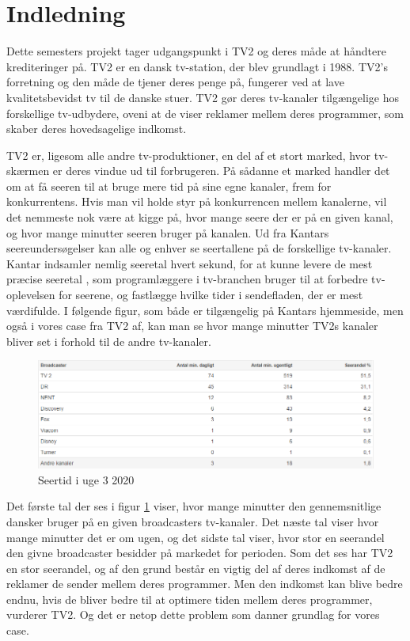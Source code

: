\clearpage
\section{Indledning}
Dette semesters projekt tager udgangspunkt i TV2 og deres måde at håndtere krediteringer på. TV2 er en dansk tv-station, der blev grundlagt i 1988. TV2's forretning og den måde de tjener deres penge på, fungerer ved at lave kvalitetsbevidst tv til de danske stuer. TV2 gør deres tv-kanaler tilgængelige hos forskellige tv-udbydere, oveni at de viser reklamer mellem deres programmer, som skaber deres hovedsagelige indkomst.

TV2 er, ligesom alle andre tv-produktioner, en del af et stort marked, hvor tv-skærmen er deres vindue ud til forbrugeren. På sådanne et marked handler det om at få seeren til at bruge mere tid på sine egne kanaler, frem for konkurrentens. Hvis man vil holde styr på konkurrencen mellem kanalerne, vil det nemmeste nok være at kigge på, hvor mange seere der er på en given kanal, og hvor mange minutter seeren bruger på kanalen. Ud fra Kantars seereundersøgelser kan alle og enhver se seertallene på de forskellige tv-kanaler. Kantar indsamler nemlig seeretal hvert sekund, for at kunne levere de mest præcise seeretal \cite{url_kantar} , som programlæggere i tv-branchen bruger til at forbedre tv-oplevelsen for seerene, og fastlægge hvilke tider i sendefladen, der er mest værdifulde. I følgende figur, som både er tilgængelig på Kantars hjemmeside, men også i vores case fra TV2 af, kan man se hvor mange minutter TV2s kanaler bliver set i forhold til de andre tv-kanaler.
\begin{figure}[H]
    \centering
\includegraphics[scale = 0.75]{images/Seertal.png}
    \caption{Seertid i uge 3 2020}
    \label{fig:Seertid}
\end{figure}
Det første tal der ses i figur \ref{fig:Seertid} viser, hvor mange minutter den gennemsnitlige dansker bruger på en given broadcasters tv-kanaler. Det næste tal viser hvor mange minutter det er om ugen, og det sidste tal viser, hvor stor en seerandel den givne broadcaster besidder på markedet for perioden. 
Som det ses har TV2 en stor seerandel, og af den grund består en vigtig del af deres indkomst af de reklamer de sender mellem deres programmer.  Men den indkomst kan blive bedre endnu, hvis de bliver bedre til at optimere tiden mellem deres programmer, vurderer TV2. Og det er netop dette problem som danner grundlag for vores case.

